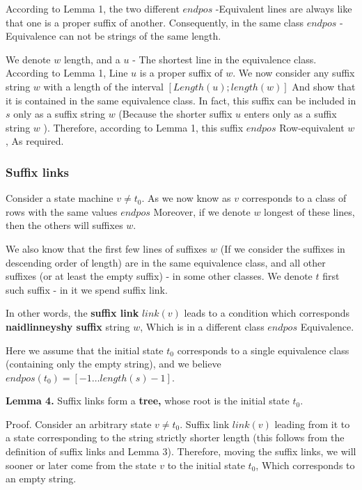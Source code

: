 According to Lemma 1, the two different $endpos$ -Equivalent lines are always like that one is a proper suffix of another. Consequently, in the same class $endpos$ -Equivalence can not be strings of the same length.

We denote $w$ length, and a $u$ - The shortest line in the equivalence class. According to Lemma 1, Line $u$ is a proper suffix of $w$. We now consider any suffix string $w$ with a length of the interval $[Length (u); length (w)]$ And show that it is contained in the same equivalence class. In fact, this suffix can be included in $s$ only as a suffix string $w$ (Because the shorter suffix $u$ enters only as a suffix string $w$ ). Therefore, according to Lemma 1, this suffix $endpos$ Row-equivalent $w$, As required.

\subsubsection{ Suffix links }

Consider a state machine $v \ne t_0$. As we now know as $v$ corresponds to a class of rows with the same values $endpos$ Moreover, if we denote $w$ longest of these lines, then the others will suffixes $w$.

We also know that the first few lines of suffixes $w$ (If we consider the suffixes in descending order of length) are in the same equivalence class, and all other suffixes (or at least the empty suffix) - in some other classes. We denote $t$ first such suffix - in it we spend suffix link.

In other words, the \textbf{suffix link} $link (v)$ leads to a condition which corresponds \textbf{naidlinneyshy suffix} string $w$, Which is in a different class $endpos$ Equivalence.

Here we assume that the initial state $t_0$ corresponds to a single equivalence class (containing only the empty string), and we believe $endpos (t_0) = [-1 \ldots length (s) -1]$.

\textbf{Lemma 4.} Suffix links form a \textbf{tree,} whose root is the initial state $t_0$.

Proof. Consider an arbitrary state $v \ne t_0$. Suffix link $link (v)$ leading from it to a state corresponding to the string strictly shorter length (this follows from the definition of suffix links and Lemma 3). Therefore, moving the suffix links, we will sooner or later come from the state $v$ to the initial state $t_0$, Which corresponds to an empty string.

